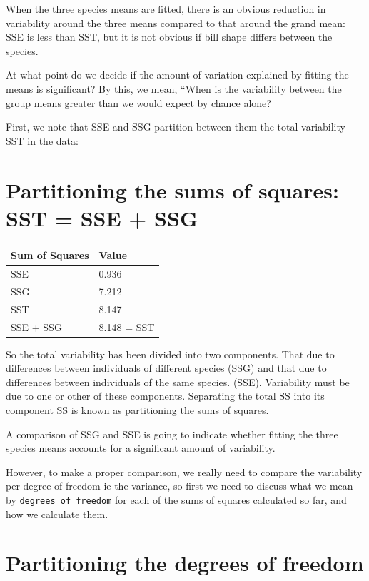 \documentclass[
  letterpaper,
  DIV=11,
  numbers=noendperiod]{scrreprt}
\begin{document}
When the three species means are fitted, there is an obvious reduction
in variability around the three means compared to that around the grand
mean: SSE is less than SST, but it is not obvious if bill shape differs
between the species.

At what point do we decide if the amount of variation explained by
fitting the means is significant? By this, we mean, ``When is the
variability between the group means greater than we would expect by
chance alone?

First, we note that SSE and SSG partition between them the total
variability SST in the data:

\section{Partitioning the sums of squares: SST = SSE +
SSG}\label{partitioning-the-sums-of-squares-sst-sse-ssg}

\begin{longtable}[]{@{}ll@{}}
\toprule\noalign{}
Sum of Squares & Value \\
\midrule\noalign{}
\endhead
\bottomrule\noalign{}
\endlastfoot
SSE & 0.936 \\
SSG & 7.212 \\
SST & 8.147 \\
SSE + SSG & 8.148 = SST \\
\end{longtable}

So the total variability has been divided into two components. That due
to differences between individuals of different species (SSG) and that
due to differences between individuals of the same species. (SSE).
Variability must be due to one or other of these components. Separating
the total SS into its component SS is known as partitioning the sums of
squares.

A comparison of SSG and SSE is going to indicate whether fitting the
three species means accounts for a significant amount of variability.

However, to make a proper comparison, we really need to compare the
variability per degree of freedom ie the variance, so first we need to
discuss what we mean by \texttt{degrees\ of\ freedom} for each of the
sums of squares calculated so far, and how we calculate them.

\section{Partitioning the degrees of
freedom}\label{partitioning-the-degrees-of-freedom}
\end{document}
